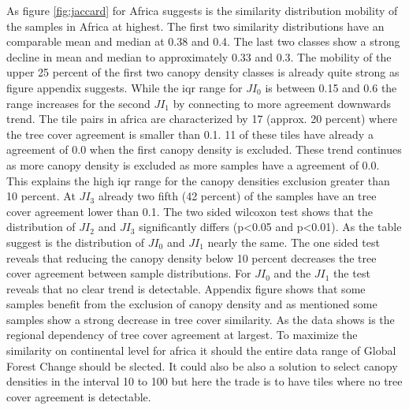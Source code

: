 			 As figure \ref{fig:jaccard} for Africa suggests is the similarity distribution mobility of the samples in Africa at highest. The first two similarity distributions have an comparable mean and median at 0.38 and 0.4. The last two classes show a strong decline in mean and median to approximately 0.33 and 0.3. The mobility of the upper 25 percent of the first two canopy density classes is already quite strong as figure appendix suggests. While the iqr range for $JI_0$ is between 0.15 and 0.6 the range increases for the second $JI_1$ by connecting to more agreement downwards trend. The tile pairs in africa are characterized by 17 (approx. 20 percent) where the tree cover agreement is smaller than 0.1. 11 of these tiles have already a agreement of 0.0 when the first canopy density is excluded. These trend continues as more canopy density is excluded as more samples have a agreement of 0.0. This explains the high iqr range for the canopy densities exclusion greater than 10 percent. At $JI_3$ already two fifth (42 percent) of the samples have an tree cover agreement lower than 0.1. The two sided wilcoxon test shows that the distribution of $JI_2$ and $JI_3$ significantly differs (p<0.05 and p<0.01). As the table suggest is the distribution of $JI_0$ and $JI_1$ nearly the same. The one sided test reveals that reducing the canopy density below 10 percent decreases the tree cover agreement between sample distributions. For $JI_0$ and the $JI_1$ the test reveals that no clear trend is detectable. Appendix figure shows that some samples benefit from the exclusion of canopy density and as mentioned some samples show a strong decrease in tree cover similarity. As the data shows is the regional dependency of tree cover agreement at largest. To maximize the similarity on continental level for africa it should the entire data range of Global Forest Change should be slected. It could also be also a solution to select canopy densities in the interval 10 to 100 but here the trade is to have tiles where no tree cover agreement is detectable.

